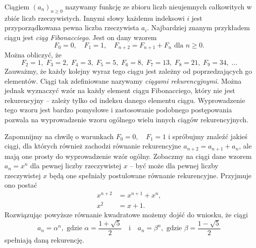 

\noindent
Ciągiem $(a_n)_{n \geqslant 0}$ nazywamy funkcję ze zbioru liczb nieujemnych całkowitych w zbiór liczb rzeczywistych. Innymi słowy każdemu indeksowi $i$ jest przyporządkowana pewna liczba rzeczywista $a_i$. Najbardziej znanym przykładem ciągu jest \textit{ciąg Fibonacciego}. Jest on dany wzorem
\[
	F_0 = 0, \quad F_1 = 1, \quad F_{n + 2} = F_{n + 1} + F_{n} \text{ dla } n \geqslant 0.
\]
Można obliczyć, że
\[
	F_2 = 1, \; F_3 = 2, \; F_4 = 3, \; F_5 = 5, \; F_6 = 8, \; F_7 = 13, \; F_8 = 21, \; F_9 = 34, \; ...
\]
Zauważmy, że każdy kolejny wyraz tego ciągu jest zależny od poprzedzających go elementów. Ciągi tak zdefiniowane nazywamy \textit{ciągami rekurencyjnymi}. Można jednak wyznaczyć wzór na każdy element ciągu Fibonacciego, który nie jest rekurencyjny -- zależy tylko od indeksu danego elementu ciągu. Wyprowadzenie tego wzoru jest bardzo pomysłowe i zastosowanie podobnego postępowania pozwala na wyprowadzenie wzoru ogólnego wielu innych ciągów rekurencyjnych.

\vspace{10px}


\noindent
Zapomnijmy na chwilę o warunkach $F_0 = 0, \quad F_1 = 1$ i spróbujmy znaleźć jakieś ciągi, dla których również zachodzi równanie rekurencyjne $a_{n + 2} = a_{n + 1} + a_n$, ale mają one prosty do wyprowadzenie wzór ogólny. Zobaczmy na ciągi dane wzorem $a_n = x^n$ dla pewnej liczby rzeczywistej $x$ -- być może dla pewnej liczby rzeczywistej $x$ będą one spełniały postulowane równanie rekurencyjne. Przyjmuje ono postać
\begin{align*}
	x^{n + 2} &= x^{n + 1} + x^n, \\
	x^2 &= x + 1.
\end{align*}
Rozwiązując powyższe równanie kwadratowe możemy dojść do wniosku, że ciągi 
\[
	a_n = \alpha^n, \text{ gdzie } \alpha = \frac{1 + \sqrt{5}}{2} \quad \text{i} \quad a_n = \beta^n,  \text{ gdzie } \beta = \frac{1 - \sqrt{5}}{2} 
\] 
spełniają daną rekurencję.

